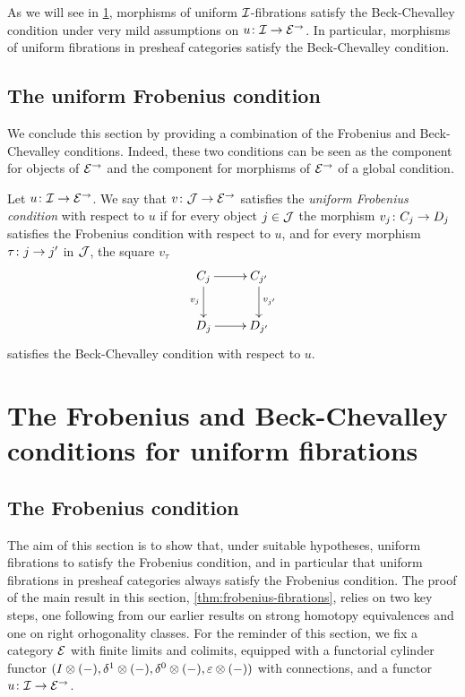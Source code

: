 \documentclass[reqno,10pt,a4paper,oneside]{amsart}
\begin{document}
As we will see in \cref{sec:frocuf}, morphisms of uniform $\cal{I}$-fibrations satisfy the Beck-Chevalley condition under very mild assumptions on $u \co \cal{I} \to \cal{E}^\to$.
In particular, morphisms of uniform fibrations in presheaf categories satisfy the Beck-Chevalley condition.

\subsection*{The uniform Frobenius condition}
We conclude this section by providing a combination of the Frobenius and Beck-Chevalley conditions.
Indeed, these two conditions can be seen as the component for objects of $\cal{E}^\to$ and the component for morphisms of $\cal{E}^\to$ of a global condition.


\begin{definition}
Let $u \co \cal{I} \to \catE^\to$.
We say that $v \co \cal{J} \to \catE^\to$ satisfies the \emph{uniform Frobenius condition} with respect to $u$ if for every object $j \in \cal{J}$ the morphism $v_j \co C_j \to D_j$ satisfies the Frobenius condition with respect to $u$, and for every morphism $\tau \co j \to j'$ in $\cal{J}$, the square $v_\tau$
\[
\xymatrix{
C_j \ar[r] \ar[d]_{v_j} & C_{j'} \ar[d]^{v_{j'}} \\
D_j \ar[r] & D_{j'}}
\]
satisfies the Beck-Chevalley condition with respect to $u$.
\end{definition}




\section{The Frobenius and Beck-Chevalley conditions for uniform fibrations}
\label{sec:frocuf}


\subsection*{The Frobenius condition}
The aim of this section is to show that, under suitable hypotheses, uniform fibrations to satisfy the Frobenius condition, and in particular that uniform fibrations in presheaf categories always satisfy the Frobenius condition.
The proof of the main result in this section, \cref{thm:frobenius-fibrations}, relies on two key steps, one following from our earlier results on strong homotopy equivalences and one on right orhogonality classes.
For the reminder of this section, we fix a category $\catE$ with finite limits and colimits, equipped with a functorial cylinder functor $(\interval \otimes (-), \rcyl \otimes (-), \lcyl \otimes (-), \ccyl \otimes (-))$ with connections, and a functor $u \co \cal{I} \to \cal{E}^\to$.
\end{document}
